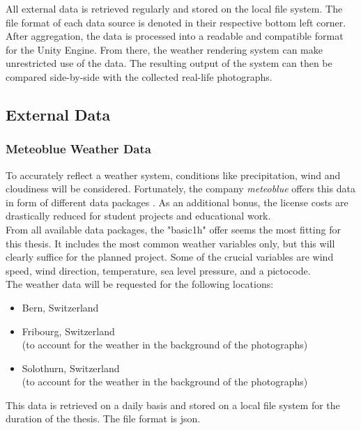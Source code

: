\noindent
All external data is retrieved regularly and stored on the local file system. The file format of each data source is denoted in their respective bottom left corner.
After aggregation, the data is processed into a readable and compatible format for the Unity Engine. From there, the weather rendering system can make unrestricted use of the data.
The resulting output of the system can then be compared side-by-side with the collected real-life photographs.

\subsection{External Data}
\subsubsection{Meteoblue Weather Data}
To accurately reflect a weather system, conditions like precipitation, wind and cloudiness will be considered.
Fortunately, the company \emph{meteoblue} offers this data in form of different data packages \cite{meteoblue}.
As an additional bonus, the license costs are drastically reduced for student projects and educational work.
\\
From all available data packages, the "basic\textunderscore1h" \cite{meteoblue:basic1h} offer seems the most fitting for this thesis.
It includes the most common weather variables only, but this will clearly suffice for the planned project.
Some of the crucial variables are wind speed, wind direction, temperature, sea level pressure, and a pictocode.
\\
The weather data will be requested for the following locations:
\begin{itemize}
    \item Bern, Switzerland
    \item Fribourg, Switzerland \\(to account for the weather in the background of the photographs)
    \item Solothurn, Switzerland \\(to account for the weather in the background of the photographs)
\end{itemize}

\noindent
This data is retrieved on a daily basis and stored on a local file system for the duration of the thesis. The file format is \gls{json}.

